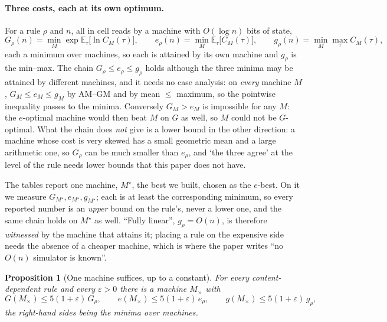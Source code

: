 \documentclass[11pt]{article}
\newtheorem{proposition}{Proposition}
\theoremstyle{remark}
\begin{document}
\paragraph{Three costs, each at its own optimum.} For a rule $\rho$ and $n$, all in cell reads by a
machine with $O(\log n)$ bits of state,
\[
G_{\rho}(n)=\min_{M}\exp\mathbb E_{\tau}\bigl[\ln C_{M}(\tau)\bigr],\qquad
e_{\rho}(n)=\min_{M}\mathbb E_{\tau}\bigl[C_{M}(\tau)\bigr],\qquad
g_{\rho}(n)=\min_{M}\max_{\tau}C_{M}(\tau),
\]
each a minimum over machines, so each is attained by its own machine and $g_{\rho}$ is the min--max.
The chain $G_{\rho}\le e_{\rho}\le g_{\rho}$ holds although the three minima may be attained by
different machines, and it needs no case analysis: on \emph{every} machine $M$,
$G_{M}\le e_{M}\le g_{M}$ by AM--GM and by mean $\le$ maximum, so the pointwise inequality passes
to the minima. Conversely $G_{M}>e_{M}$ is impossible for any $M$: the $e$-optimal machine would then
beat $M$ on $G$ as well, so $M$ could not be $G$-optimal. What the chain does \emph{not} give is a
lower bound in the other direction: a machine whose cost is very skewed has a small geometric mean
and a large arithmetic one, so $G_{\rho}$ can be much smaller than $e_{\rho}$, and `the three agree'
at the level of the rule needs lower bounds that this paper does not have.

The tables report one machine, $M^{\star}$, the best we built, chosen as the $e$-best. On it we
measure $G_{M^{\star}},e_{M^{\star}},g_{M^{\star}}$; each is at least the corresponding minimum, so
every reported number is an \emph{upper} bound on the rule's, never a lower one, and the same chain
holds on $M^{\star}$ as well. ``Fully linear'', $g_{\rho}=O(n)$, is therefore \emph{witnessed} by
the machine that attains it; placing a rule on the expensive side needs the absence of a cheaper
machine, which is where the paper writes ``no $O(n)$ simulator is known''.

\begin{proposition}[One machine suffices, up to a constant]\label{prop:simult}
For every content-dependent rule and every $\varepsilon>0$ there is a machine $M_{\times}$ with
\[
G(M_{\times})\le 5(1+\varepsilon)\,G_{\rho},\qquad
e(M_{\times})\le 5(1+\varepsilon)\,e_{\rho},\qquad
g(M_{\times})\le 5(1+\varepsilon)\,g_{\rho},
\]
the right-hand sides being the minima over machines.
\end{proposition}
\end{document}
